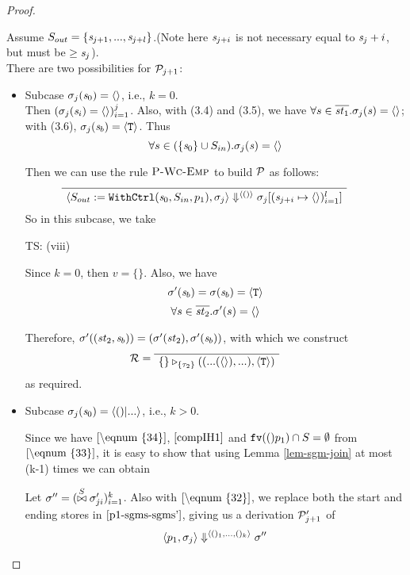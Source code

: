 \begin{proof}
\begin{itemize}
\begin{enumerate}[(i)]
	Assume $S_{out} = \{\mathit{s}_{j+1},...,\mathit{s}_{j+l}\}$.(Note here $\mathit{s}_{j+i}$ is not necessary equal to $\mathit{s}_j + i$, but must be $\ge \mathit{s}_j$). \\
	
	There are two possibilities for $\mathcal{P}_{j+1}$:
	\begin{itemize}
	\item 
	Subcase $\sigma_j(\mathit{s}_0) = \langle \rangle$, i.e., $k = 0$.\\
	Then $(\sigma_j(\mathit{s}_i) = \langle \rangle)^j_{i=1}$. Also, with (3.4) and (3.5), we have 
	$\forall s \in \overline{\mathit{st}_1}. \sigma_j(\mathit{s}) = \langle \rangle$; 
	with (3.6), $\sigma_j(\mathit{s}_b) = \langle \mathtt{T} \rangle $.
	Thus $$\forall s \in (\{\mathit{s}_0\} \cup S_{in}). \sigma_j(\mathit{s}) = \langle \rangle$$ 
	
	Then we can use the rule $\textsc{P-Wc-Emp}$ to build $\mathcal{P}$ as follows:
	$$\PT{
		\Axiom{\seval{\wcdef}{\sgm_j}{\< () \'>}
			   {\sgm_j[\l{\s_{j+i} \|-> \emptyv}]}}
	  }$$ 
    So in this subcase, we take 
	
	TS: (viii)
	\def\sgmpempty{\sgm[\s_0 \|-> \emptyv, \s_1' \|-> \emptyv, ..., \s_j' \|-> \emptyv]}

	Since $k=0$, then $v = \{ \}$. Also, we have 
	$$\sigma'(\mathit{s}_b) = \sigma(\mathit{s}_b) = \langle \mathtt{T} \rangle$$
	$$\forall s \in \overline{\mathit{st}_2}. \sigma'(s) = \langle \rangle$$ 
	
	Therefore, $\sigma'((\mathit{st}_2,\mathit{s}_b)) = (\sigma'(\mathit{st}_2), \sigma'(\mathit{s}_b))$, with which we construct 
	$$\MR = 
	\PT{\Axiom{\ValRep{\{\}}{\tseq{\tau_2}}{((...(\emptyv),...),\oT)}}}$$ 
	as required.\\
    
\def\sgmp-nonempty{\sgm[\s_0 \|-> \kunit, \s_1' \|-> \sgm''(\s'_1),...,
	\s'_j \|-> \sgm''(\s'_j)]}  

	\item \label{subcase-2} 
	Subcase $\sgm_j(\s_0) = \<()|...\'>$, i.e., $k > 0$.
	
    Since we have $\eqref{\eqnum{34}}$, $\eqref{compIH1}$ and  $\mathtt{fv}(()p_1) \cap S = \emptyset$ from $\eqref{\eqnum{33}}$,
	it is easy to show that using Lemma \ref{lem-sgm-join} at most (k-1) times we can obtain

    Let $\sigma'' = (\stackrel{S}{\bowtie} \sigma_{ji}')^k_{i=1}$. Also with $\eqref{\eqnum{32}}$, we replace both the start and ending stores in $\eqref{p1-sgms-sgms'}$, giving us 
    a derivation $\mathcal{P}_{j+1}'$ of
    $$\left\langle p_1,\sigma_j \right\rangle \Downarrow^{\langle ()_1,...,()_k \rangle} \sigma''$$
	

\end{itemize}
\end{enumerate}
\end{itemize}
\end{proof}
